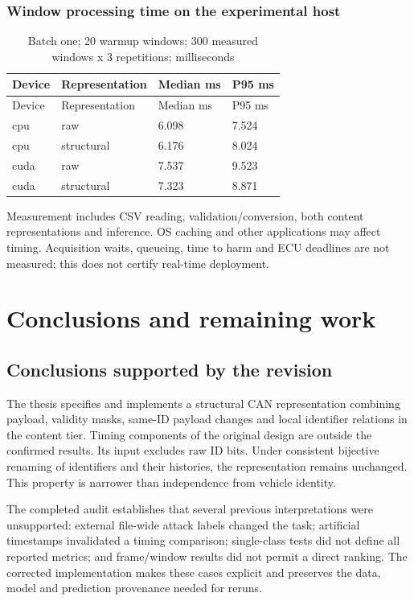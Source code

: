 \documentclass[12pt,a4paper,oneside,openany]{extbook}
\begin{document}
\subsection{Window processing time on the experimental host}
\begin{longtable}{P{2.0cm}P{3.6cm}P{3.2cm}P{3.2cm}}
\caption{Batch one; 20 warmup windows; 300 measured windows x 3 repetitions; milliseconds}\label{tab:extension-runtime}\\\toprule
Device & Representation & Median ms & P95 ms\\\midrule\endfirsthead
\toprule
Device & Representation & Median ms & P95 ms\\\midrule\endhead
cpu & raw & 6.098 & 7.524\\
cpu & structural & 6.176 & 8.024\\
cuda & raw & 7.537 & 9.523\\
cuda & structural & 7.323 & 8.871\\
\bottomrule\end{longtable}
Measurement includes CSV reading, validation/conversion, both content representations and inference. OS caching and other applications may affect timing. Acquisition waits, queueing, time to harm and ECU deadlines are not measured; this does not certify real-time deployment.


\chapter{Conclusions and remaining work}\label{chap:conclusion}
\section{Conclusions supported by the revision}
The thesis specifies and implements a structural CAN representation combining payload, validity masks, same-ID payload changes and local identifier relations in the content tier. Timing components of the original design are outside the confirmed results. Its input excludes raw ID bits. Under consistent bijective renaming of identifiers and their histories, the representation remains unchanged. This property is narrower than independence from vehicle identity.

The completed audit establishes that several previous interpretations were unsupported: external file-wide attack labels changed the task; artificial timestamps invalidated a timing comparison; single-class tests did not define all reported metrics; and frame/window results did not permit a direct ranking. The corrected implementation makes these cases explicit and preserves the data, model and prediction provenance needed for reruns.
\end{document}
